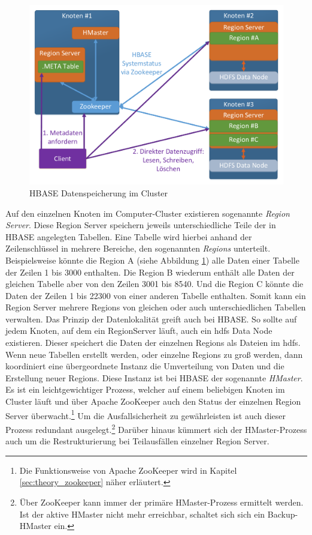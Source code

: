 \begin{figure}[ht]
  \centering
  \includegraphics[width=\textwidth]{./resource/hbase_cluster_architecture.pdf}
  \caption{HBASE Datenspeicherung im Cluster}
  \label{fig:hbase_cluster_architecture}
\end{figure}

\noindent
Auf den einzelnen Knoten im Computer-Cluster existieren sogenannte \textit{Region Server}. Diese Region Server speichern jeweils unterschiedliche Teile der in HBASE angelegten Tabellen. 
Eine Tabelle wird hierbei anhand der Zeilenschlüssel in mehrere Bereiche, den sogenannten \textit{Regions} unterteilt. Beispielsweise könnte die Region A (siehe Abbildung \ref{fig:hbase_cluster_architecture}) alle Daten einer Tabelle der Zeilen 1 bis 3000 enthalten. Die Region B wiederum enthält alle Daten der gleichen Tabelle aber von den Zeilen 3001 bis 8540. Und die Region C könnte die Daten der Zeilen 1 bis 22300 von einer anderen Tabelle enthalten. Somit kann ein Region Server mehrere Regions von gleichen oder auch unterschiedlichen Tabellen verwalten.  Das Prinzip der Datenlokalität greift auch bei HBASE. So sollte auf  jedem Knoten, auf dem ein RegionServer läuft, auch ein \gls{hdfs} Data Node existieren. Dieser speichert die Daten der einzelnen Regions als Dateien im \gls{hdfs}.\\

\noindent
Wenn neue Tabellen erstellt werden, oder einzelne Regions zu groß werden, dann koordiniert eine übergeordnete Instanz die Umverteilung von Daten und die Erstellung neuer Regions. Diese Instanz ist bei HBASE der sogenannte \textit{HMaster}. Es ist ein leichtgewichtiger Prozess, welcher auf einem beliebigen Knoten im Cluster läuft und über Apache ZooKeeper auch den Status der einzelnen Region Server überwacht.\footnote{Die Funktionsweise von Apache ZooKeeper wird in Kapitel \ref{sec:theory_zookeeper} näher erläutert.} Um die Ausfallsicherheit zu gewährleisten ist auch dieser Prozess redundant ausgelegt.\footnote{Über ZooKeeper kann immer der primäre HMaster-Prozess ermittelt werden. Ist der aktive HMaster nicht mehr erreichbar, schaltet sich sich ein Backup-HMaster ein.} Darüber hinaus kümmert sich der HMaster-Prozess auch um die Restrukturierung bei Teilausfällen einzelner Region Server. 

